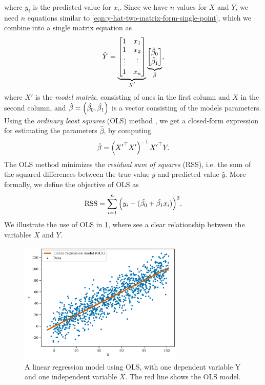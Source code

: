 where $\hat{y_i}$ is the predicted value for $x_i$. Since we have $n$ values for $X$ and $Y$, we need $n$ equations similar to \cref{eqn:y-hat-two-matrix-form-single-point}, which we combine into a single matrix equation as
\begin{align}
    \hat{Y} =
        \undertext{
        \begin{bmatrix}
            1 & x_1 \\
            1 & x_2 \\
            \vdots & \vdots \\
            1 & x_n \\
        \end{bmatrix}
        }{$X'$}
        \undertext{
        \begin{bmatrix}
            \hat{\beta}_0 \\
            \hat{\beta}_1 \\
        \end{bmatrix}
        }{$\hat{\beta}$},
    \label{eqn:y-hat-two-matrix-form}
\end{align}
where $X'$ is the \textit{model matrix}, consisting of ones in the first column and $X$ in the second column, and $\hat{\beta} = \left(\hat{\beta_0}, \hat{\beta_1}\right)$ is a vector consisting of the models parameters. Using the \textit{ordinary least squares} (OLS) method \cite[p. 208]{fox2015applied}, we get a closed-form expression for estimating the parameters $\hat{\beta}$, by computing
\begin{align}
    \hat{\beta} = \left({X'}^\top X'\right)^{-1} {X'}^\top Y.
    \label{eqn:ordinary-least-squares}
\end{align}
The OLS method minimizes the \textit{residual sum of squares} (RSS), i.e. the sum of the squared differences between the true value $y$ and predicted value $\hat{y}$. More formally, we define the objective of OLS as
\begin{align}
    \text{RSS} = \sum\limits_{i=1}^{n}{\left(y_i - (\hat{\beta_0} + \hat{\beta_1}x_i)\right)^2}.
    \label{eqn:RSS-ols-two-variables}
\end{align}
We illustrate the use of OLS in \cref{fig:linear-regression-ols}, where see a clear relationship between the variables $X$ and $Y$.
\begin{figure}[H]
    \centering
    \includegraphics[width=0.7\textwidth]{thesis/figures/linear-regression-example.pdf}
    \caption{A linear regression model using OLS, with one dependent variable Y and one independent variable $X$. The red line shows the OLS model.}
    \label{fig:linear-regression-ols}
\end{figure}

